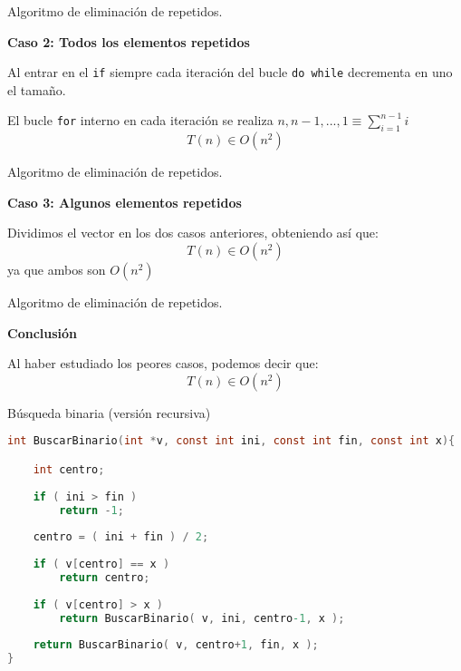 \documentclass[10pt, xcolor=table]{beamer}
\begin{document}
\begin{frame}[fragile]{Algoritmo de eliminación de repetidos. 
}

\begin{center}
\textbf{\large{Caso 2: Todos los elementos repetidos}}
\end{center}
Al entrar en el \texttt{if} siempre cada iteración del bucle \texttt{do while} decrementa en uno el tamaño. 

El bucle \texttt{for} interno en cada iteración se realiza $n, n-1, ..., 1 \equiv \sum_{i=1}^{n-1}{i}$  $$T(n) \in O(n^2)$$
\end{frame}

\begin{frame}[fragile]{Algoritmo de eliminación de repetidos. 
}

\begin{center}
	\textbf{\large{Caso 3: Algunos elementos repetidos }}
\end{center}
Dividimos el vector en los dos casos anteriores, obteniendo así que: $$T(n) \in O(n^2)$$ ya que ambos son $O(n^2)$
\end{frame}

\begin{frame}[fragile]{Algoritmo de eliminación de repetidos. 
}

\begin{center}
\textbf{\large{Conclusión}}
\end{center}

Al haber estudiado los peores casos, podemos decir que: $$T(n) \in O(n^2)$$
\end{frame}


\begin{frame}[fragile]{Búsqueda binaria (versión recursiva)}
\begin{lstlisting}[language=C]
int BuscarBinario(int *v, const int ini, const int fin, const int x){

	int centro;
	
	if ( ini > fin )
		return -1;
	
	centro = ( ini + fin ) / 2;
	
	if ( v[centro] == x )
		return centro;
	
	if ( v[centro] > x )
		return BuscarBinario( v, ini, centro-1, x );
	
	return BuscarBinario( v, centro+1, fin, x );
}
\end{lstlisting}
\end{frame}
\end{document}
